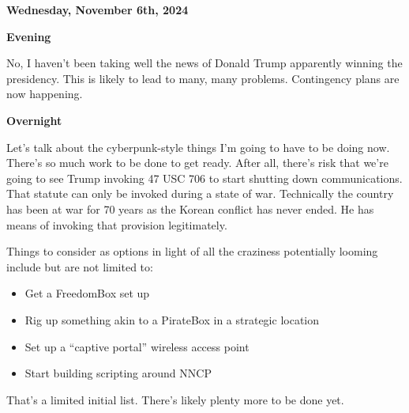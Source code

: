 \textbf{Wednesday, November 6th,
2024}

\textbf{Evening}

No, I haven't been taking well the news of Donald Trump apparently
winning the presidency. This is likely to lead to many, many problems.
Contingency plans are now happening.

\textbf{Overnight}

Let's talk about the cyberpunk-style things I'm going to have to be
doing now. There's so much work to be done to get ready. After all,
there's risk that we're going to see Trump invoking 47 USC 706 to start
shutting down communications. That statute can only be invoked during a
state of war. Technically the country has been at war for 70 years as
the Korean conflict has never ended. He has means of invoking that
provision legitimately.

Things to consider as options in light of all the craziness potentially
looming include but are not limited to:

\begin{itemize}
\item
  Get a FreedomBox set up
\item
  Rig up something akin to a PirateBox in a strategic location
\item
  Set up a ``captive portal'' wireless access point
\item
  Start building scripting around NNCP
\end{itemize}

That's a limited initial list. There's likely plenty more to be done
yet.
